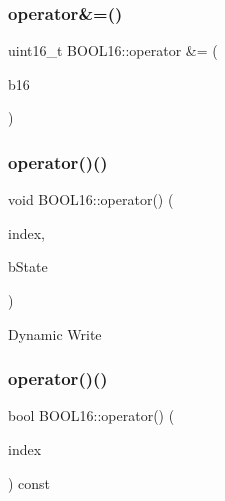 \subsubsection{\texorpdfstring{operator\&=()}{operator\&=()}\hspace{0.1cm}{\footnotesize\ttfamily [2/2]}}
{\footnotesize\ttfamily uint16\+\_\+t B\+O\+O\+L16\+::operator \&= (\begin{DoxyParamCaption}\item[{const \hyperlink{struct_b_o_o_l16}{B\+O\+O\+L16}}]{b16 }\end{DoxyParamCaption})\hspace{0.3cm}{\ttfamily [inline]}}

\hypertarget{struct_b_o_o_l16_a572432f46b8e2e877b80ab5a16f5f160}{}\label{struct_b_o_o_l16_a572432f46b8e2e877b80ab5a16f5f160} 
\subsubsection{\texorpdfstring{operator()()}{operator()()}\hspace{0.1cm}{\footnotesize\ttfamily [1/2]}}
{\footnotesize\ttfamily void B\+O\+O\+L16\+::operator() (\begin{DoxyParamCaption}\item[{const uint8\+\_\+t}]{index,  }\item[{const bool}]{b\+State }\end{DoxyParamCaption})\hspace{0.3cm}{\ttfamily [inline]}}

Dynamic Write \hypertarget{struct_b_o_o_l16_a4a65f5b5680eab5e72f503e40eb26f3c}{}\label{struct_b_o_o_l16_a4a65f5b5680eab5e72f503e40eb26f3c} 
\subsubsection{\texorpdfstring{operator()()}{operator()()}\hspace{0.1cm}{\footnotesize\ttfamily [2/2]}}
{\footnotesize\ttfamily bool B\+O\+O\+L16\+::operator() (\begin{DoxyParamCaption}\item[{const uint8\+\_\+t}]{index }\end{DoxyParamCaption}) const\hspace{0.3cm}{\ttfamily [inline]}}

